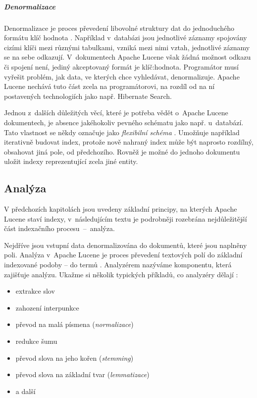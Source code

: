 \documentclass[11pt,oneside]{fithesis2}
\begin{document}
\subparagraph{Denormalizace}
\label{Denormalizace}
Denormalizace je proces převedení libovolné struktury dat do jednoduchého formátu klíč hodnota \cite[s.~34]{LuceneAction}. Například v~databázi jsou jednotlivé záznamy spojovány cizími klíči mezi různými tabulkami, vzniká mezi nimi vztah, jednotlivé záznamy se na sebe odkazují. V~dokumentech Apache Lucene však žádná možnost odkazu či spojení není, jediný akceptovaný formát je klíč:hodnota. Programátor musí vyřešit problém, jak data, ve kterých chce vyhledávat, denormalizuje. Apache Lucene nechává tuto část zcela na programátorovi, na rozdíl od na ní postavených technologiích jako např. Hibernate Search.

Jednou z~dalších důležitých věcí, které je potřeba vědět o~Apache Lucene dokumentech, je absence jakéhokoliv pevného schématu jako např. u~databází. Tato vlastnost se někdy označuje jako \emph{flexibilní schéma} \cite[s.~34]{LuceneAction}. Umožňuje například iterativně budovat index, protože nově nahraný index může být naprosto rozdílný, obsahovat jiná pole, od předchozího. Rovněž je možné do jednoho dokumentu uložit indexy reprezentující zcela jiné entity.

\subsection{Analýza}
V předchozích kapitolách jsou uvedeny základní principy, na kterých Apache Lucene staví indexy, v~následujícím textu je podrobněji rozebrána nejdůležitější část indexačního procesu~--~analýza.

Nejdříve jsou vstupní data denormalizována do dokumentů, které jsou naplněny poli. Analýza v~Apache Lucene je proces převedení textových polí do základní indexované podoby -- do termů \cite[s.~28]{LuceneAction}. Analyzérem nazýváme komponentu, která zajišťuje analýzu. Ukažme si několik typických příkladů, co analyzéry dělají  \cite[s.~110]{LuceneAction}:

\begin{itemize}
	\item extrakce slov
	\item zahození interpunkce
	\item převod na malá písmena (\emph{normalizace})
	\item redukce šumu
	\item převod slova na jeho kořen (\emph{stemming})
	\item převod slova na základní tvar (\emph{lemmatizace})
	\item a další 
\end{itemize}
\end{document}
